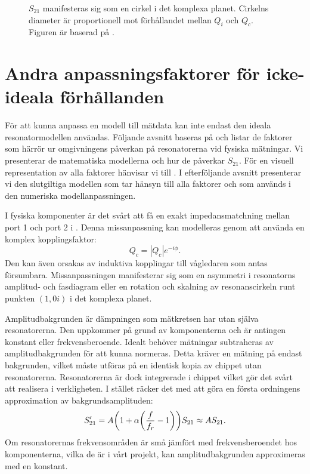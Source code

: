 \documentclass[main.tex]{subfiles}
\begin{document}
\begin{figure}[H]
  \centering
  \setlength\figurewidth{14em}
  \setlength\figureheight{\figurewidth}
  
  \caption{$S_{21}$ manifesteras sig som en cirkel i det komplexa planet. Cirkelns diameter är proportionell mot förhållandet mellan $Q_i$ och $Q_c$. Figuren är baserad på \cite[fig. 2.4d]{Boehme2016}.}
  \label{fig:ex_cmplx}
\end{figure}

\section{Andra anpassningsfaktorer för icke-ideala förhållanden}
\label{sec:omgivning}
För att kunna anpassa en modell till mätdata kan inte endast den ideala resonatormodellen användas. Följande avsnitt baseras på \cite{Boehme2016,Probst2015} och listar de faktorer som härrör ur omgivningens påverkan på resonatorerna vid fysiska mätningar. Vi presenterar de matematiska modellerna och hur de påverkar $S_{21}$. För en visuell representation av alla faktorer hänvisar vi till \cite[fig. 3]{Probst2015}. I efterföljande avsnitt presenterar vi den slutgiltiga modellen som tar hänsyn till alla faktorer och som används i den numeriska modellanpassningen.

I fysiska komponenter är det svårt att få en exakt impedansmatchning mellan port 1 och port 2 i . Denna missanpassning kan modelleras genom att använda en komplex kopplingsfaktor:
\begin{equation}
    Q_c=|Q_c|e^{-i\phi}.
\end{equation}
Den kan även orsakas av induktiva kopplingar till vågledaren som antas försumbara. Missanpassningen manifesterar sig som en asymmetri i resonatorns amplitud- och fasdiagram eller en rotation och skalning av resonanscirkeln runt punkten $(1,0i)$ i det komplexa planet.

Amplitudbakgrunden är dämpningen som mätkretsen har utan själva resonatorerna. Den uppkommer på grund av komponenterna och är antingen konstant eller frekvensberoende.
Idealt behöver mätningar subtraheras av amplitudbakgrunden för att kunna normeras. Detta kräver en mätning på endast bakgrunden, vilket måste utföras på en identisk kopia av chippet utan resonatorerna. Resonatorerna är dock integrerade i chippet vilket gör det svårt att realisera i verkligheten. I stället räcker det med att göra en första ordningens approximation av bakgrundsamplituden:
\begin{equation}
    S'_{21} = A\qty(1+\alpha\qty(\frac{f}{f_r}-1))S_{21} \approx A S_{21}.
\end{equation}
Om resonatorernas frekvensområden är små jämfört med frekvensberoendet hos komponenterna, vilka de är i vårt projekt, kan amplitudbakgrunden approximeras med en konstant.
\end{document}
